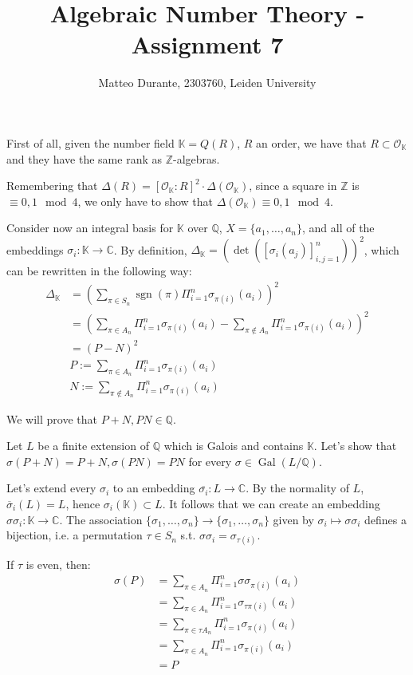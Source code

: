 \documentclass{article}
\newcommand{\numberset}{\mathbb}
\newcommand{\Z}{\numberset{Z}}
\newcommand{\Q}{\numberset{Q}}
\newcommand{\C}{\numberset{C}}
\newcommand{\K}{\numberset{K}}
\newcommand{\exercise}[1]{\noindent {\bf Exercise #1}}
\newcommand{\Gal}{\operatorname{Gal}}
\newcommand{\sgn}{\operatorname{sgn}}
\begin{document}
\title{Algebraic Number Theory - Assignment 7}

\author{Matteo Durante, 2303760, Leiden University}

\maketitle

\exercise{13}

First of all, given the number field $\K=Q(R)$, $R$ an order, we have that $R\subset\mathcal{O}_{\K}$ and they have the same rank as $\Z$-algebras.

Remembering that $\Delta(R)=[\mathcal{O}_{\K}:R]^2\cdot\Delta(\mathcal{O}_{\K})$, since a square in $\Z$ is $\equiv 0,1\mod 4$, we only have to show that $\Delta(\mathcal{O}_{\K})\equiv 0,1\mod 4$.

Consider now an integral basis for $\K$ over $\Q$, $X=\{a_1,\ldots,a_n\}$, and all of the embeddings $\sigma_i:\K\rightarrow\C$. By definition, $\Delta_{\K}=(\det([\sigma_i(a_j)]_{i,j=1}^n))^2$, which can be rewritten in the following way:
\begin{align*}
  \Delta_{\K} & = \left(\sum_{\pi\in S_n} \sgn(\pi)\Pi_{i=1}^n \sigma_{\pi(i)}(a_i)\right)^2 \\
  & =\left(\sum_{\pi\in A_n}\Pi_{i=1}^n \sigma_{\pi(i)}(a_i)-\sum_{\pi\not\in A_n}\Pi_{i=1}^n \sigma_{\pi(i)}(a_i)\right)^2 \\
  & =(P-N)^2 \\
  & P:=\sum_{\pi\in A_n}\Pi_{i=1}^n \sigma_{\pi(i)}(a_i) \\
  & N:=\sum_{\pi\not\in A_n}\Pi_{i=1}^n \sigma_{\pi(i)}(a_i)
\end{align*}

We will prove that $P+N,PN\in\Q$.

Let $L$ be a finite extension of $\Q$ which is Galois and contains $\K$. Let's show that $\sigma(P+N)=P+N,\sigma(PN)=PN$ for every $\sigma\in\Gal(L/\Q)$.

Let's extend every $\sigma_i$ to an embedding $\overline{\sigma_i}:L\rightarrow\C$. By the normality of $L$, $\overline{\sigma}_i(L)=L$, hence $\sigma_i(\K)\subset L$. It follows that we can create an embedding $\sigma\sigma_i:\K\rightarrow\C$. The association $\{\sigma_1,\ldots,\sigma_n\}\rightarrow\{\sigma_1,\ldots,\sigma_n\}$ given by $\sigma_i\mapsto\sigma\sigma_i$ defines a bijection, i.e. a permutation $\tau\in S_n$ s.t. $\sigma\sigma_i=\sigma_{\tau(i)}$.

If $\tau$ is even, then:
\begin{align*}
  \sigma(P) & =\sum_{\pi\in A_n}\Pi_{i=1}^n \sigma\sigma_{\pi(i)}(a_i) \\
  & =\sum_{\pi\in A_n}\Pi_{i=1}^n \sigma_{\tau\pi(i)}(a_i) \\
  & =\sum_{\pi\in\tau A_n}\Pi_{i=1}^n \sigma_{\pi(i)}(a_i) \\
  & =\sum_{\pi\in A_n}\Pi_{i=1}^n \sigma_{\pi(i)}(a_i) \\
  & = P
\end{align*}
\end{document}
